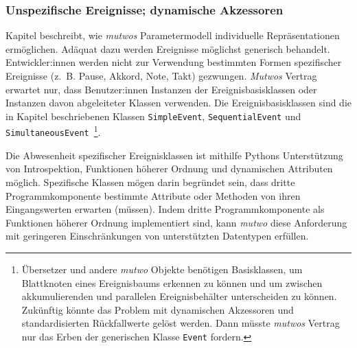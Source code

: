 \documentclass[12pt,a4paper,ngerman]{article}
\begin{document}
\subsubsection{Unspezifische Ereignisse; dynamische Akzessoren}

Kapitel \emph{} beschreibt, wie \emph{mutwos} Parametermodell individuelle Repräsentationen ermöglichen.
Adäquat dazu werden Ereignisse möglichst generisch behandelt.
Entwickler:innen werden nicht zur Verwendung bestimmten Formen spezifischer Ereignisse (z.~B. Pause, Akkord, Note, Takt) gezwungen.
\emph{Mutwos} Vertrag erwartet nur, dass Benutzer:innen Instanzen der Ereignisbasisklassen oder Instanzen davon abgeleiteter Klassen verwenden.
Die Ereignisbasisklassen sind die in Kapitel \emph{} beschriebenen Klassen \texttt{SimpleEvent}, \texttt{SequentialEvent} und \texttt{SimultaneousEvent}~\footnote{%
    Übersetzer und andere \emph{mutwo} Objekte benötigen Basisklassen, um Blattknoten eines Ereignisbaums erkennen zu können und um zwischen akkumulierenden und parallelen Ereignisbehälter unterscheiden zu können.
    Zukünftig könnte das Problem mit dynamischen Akzessoren und standardisierten Rückfallwerte gelöst werden.
    Dann müsste \emph{mutwos} Vertrag nur das Erben der generischen Klasse \texttt{Event} fordern.
}.

\bigskip

Die Abwesenheit spezifischer Ereignisklassen ist mithilfe Pythons Unterstützung von Introspektion, Funktionen höherer Ordnung und dynamischen Attributen möglich.
Spezifische Klassen mögen darin begründet sein, dass dritte Programmkomponente bestimmte Attribute oder Methoden von ihren Eingangswerten erwarten (müssen).
Indem dritte Programmkomponente als Funktionen höherer Ordnung implementiert sind, kann \emph{mutwo} diese Anforderung mit geringeren Einschränkungen von unterstützten Datentypen erfüllen.


%


\end{document}
